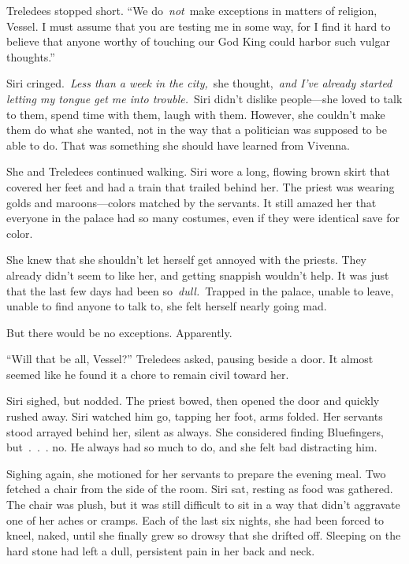 Treledees stopped short. “We do~\textit{not}~make exceptions in matters of religion, Vessel. I must assume that you are testing me in some way, for I find it hard to believe that anyone worthy of touching our God King could harbor such vulgar thoughts.”

Siri cringed.~\textit{Less than a week in the city,}~she thought,~\textit{and I’ve already started letting my tongue get me into trouble.}~Siri didn’t dislike people—she loved to talk to them, spend time with them, laugh with them. However, she couldn’t make them do what she wanted, not in the way that a politician was supposed to be able to do. That was something she should have learned from Vivenna.

She and Treledees continued walking. Siri wore a long, flowing brown skirt that covered her feet and had a train that trailed behind her. The priest was wearing golds and maroons—colors matched by the servants. It still amazed her that everyone in the palace had so many costumes, even if they were identical save for color.

She knew that she shouldn’t let herself get annoyed with the priests. They already didn’t seem to like her, and getting snappish wouldn’t help. It was just that the last few days had been so~\textit{dull.}~Trapped in the palace, unable to leave, unable to find anyone to talk to, she felt herself nearly going mad.

But there would be no exceptions. Apparently.

“Will that be all, Vessel?” Treledees asked, pausing beside a door. It almost seemed like he found it a chore to remain civil toward her.

Siri sighed, but nodded. The priest bowed, then opened the door and quickly rushed away. Siri watched him go, tapping her foot, arms folded. Her servants stood arrayed behind her, silent as always. She considered finding Bluefingers, but~.~.~. no. He always had so much to do, and she felt bad distracting him.

Sighing again, she motioned for her servants to prepare the evening meal. Two fetched a chair from the side of the room. Siri sat, resting as food was gathered. The chair was plush, but it was still difficult to sit in a way that didn’t aggravate one of her aches or cramps. Each of the last six nights, she had been forced to kneel, naked, until she finally grew so drowsy that she drifted off. Sleeping on the hard stone had left a dull, persistent pain in her back and neck.


